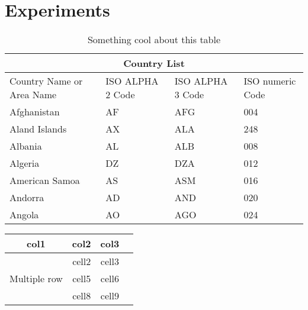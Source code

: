\chapter{Experiments}\label{chapter:experiments}

\begin{table}[h]
    \centering
    \caption{Something cool about this table}
    \begin{tabular}{ |p{3cm}||p{3cm}|p{3cm}|p{3cm}|  }
        \hline
        \multicolumn{4}{|c|}{Country List}                                                 \\
        \hline
        Country Name or Area Name & ISO ALPHA 2 Code & ISO ALPHA 3 Code & ISO numeric Code \\
        \hline
        Afghanistan               & AF               & AFG              & 004              \\
        Aland Islands             & AX               & ALA              & 248              \\
        Albania                   & AL               & ALB              & 008              \\
        Algeria                   & DZ               & DZA              & 012              \\
        American Samoa            & AS               & ASM              & 016              \\
        Andorra                   & AD               & AND              & 020              \\
        Angola                    & AO               & AGO              & 024              \\
        \hline
    \end{tabular}
    \label{table:effintable}
\end{table}

\begin{tabular}{ |c|c|c|c| }
    \hline
    col1                            & col2  & col3  \\
    \hline
    \multirow{3}{4em}{Multiple row} & cell2 & cell3 \\
                                    & cell5 & cell6 \\
                                    & cell8 & cell9 \\
    \hline
\end{tabular}
